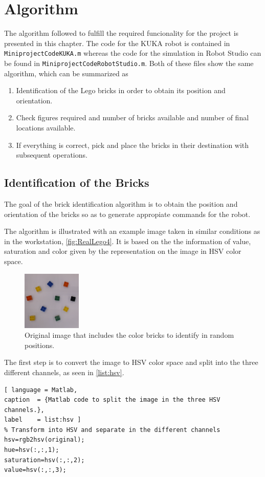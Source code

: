 \chapter{Algorithm}\label{chap:algorithm}
The algorithm followed to fulfill the required funcionality for the project is presented in this chapter. The code for the KUKA robot is contained in \lstinline[style=matlabinline]{MiniprojectCodeKUKA.m} whereas the code for the simulation in Robot Studio can be found in \lstinline[style=matlabinline]{MiniprojectCodeRobotStudio.m}. Both of these files show the same algorithm, which can be summarized as
\begin{enumerate}
	\item Identification of the Lego bricks in order to obtain its position and orientation.
	\item Check figures required and number of bricks available and number of final locations available. 
	\item If everything is correct, pick and place the bricks in their destination with subsequent operations.
\end{enumerate}
\section{Identification of the Bricks}
The goal of the brick identification algorithm is to obtain the position and orientation of the bricks so as to generate appropiate commands for the robot.

The algorithm is illustrated with an example image taken in similar conditions as in the workstation, \autoref{fig:RealLego4}. It is based on the the information of value, saturation and color given by the representation on the image in HSV color space.

\begin{figure}[H]
	\includegraphics[width=0.25\textwidth]{figures/original.png}
	\caption{Original image that includes the color bricks to identify in random positions.}
	\label{fig:RealLego4}
\end{figure}

The first step is to convert the image to HSV color space and split into the three different channels, as seen in \autoref{list:hsv}.
%
\begin{lstlisting}[ language = Matlab,
caption  = {Matlab code to split the image in the three HSV channels.},
label    = list:hsv ]
% Transform into HSV and separate in the different channels
hsv=rgb2hsv(original);
hue=hsv(:,:,1);
saturation=hsv(:,:,2);
value=hsv(:,:,3);
\end{lstlisting}

